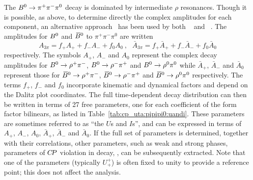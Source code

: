 The $B^0 \to \pi^+\pi^-\pi^0$ decay is dominated by 
intermediate $\rho$ resonances.
Though it is possible, as above, 
to determine directly the complex amplitudes for each component,
an alternative approach~\cite{Snyder:1993mx,Quinn:2000by}
has been used by both \babar~\cite{Aubert:2007jn,Lees:2013nwa}
and \belle~\cite{Kusaka:2007dv,:2007mj}.
The amplitudes for $B^0$ and $\kern 0.18em\overline{\kern -0.18em B}{}^0$ to $\pi^+\pi^-\pi^0$ are written
\begin{equation}
  A_{3\pi} = f_+ A_+ + f_- A_- + f_0 A_0
  \ , \ \ \ 
  \bar{A}_{3\pi} = f_+ \bar{A}_+ + f_- \bar{A}_- + f_0 \bar{A}_0
\end{equation}
respectively.
The symbols $A_+$, $A_-$ and $A_0$
represent the complex decay amplitudes for 
$B^0 \to \rho^+\pi^-$, $B^0 \to \rho^-\pi^+$ and $B^0 \to \rho^0\pi^0$
while 
$\bar{A}_+$, $\bar{A}_-$ and $\bar{A}_0$
represent those for 
$\kern 0.18em\overline{\kern -0.18em B}{}^0 \to \rho^+\pi^-$, $\kern 0.18em\overline{\kern -0.18em B}{}^0 \to \rho^-\pi^+$ and $\kern 0.18em\overline{\kern -0.18em B}{}^0 \to \rho^0\pi^0$
respectively.
The terms $f_+$, $f_-$ and $f_0$ incorporate kinematic and dynamical factors
and depend on the Dalitz plot coordinates.
The full time-dependent decay distribution can then be written 
in terms of 27 free parameters,
one for each coefficient of the form factor bilinears,
as listed in Table~\ref{tab:cp_uta:pipipi0:uandi}.
These parameters are sometimes referred to as ``the $U$s and $I$s'',
and can be expressed in terms of 
$A_+$, $A_-$, $A_0$, $\bar{A}_+$, $\bar{A}_-$ and $\bar{A}_0$.
If the full set of parameters is determined,
together with their correlations,
other parameters, such as weak and strong phases,
parameters of $C\!P$ violation in decay, \etc, 
can be subsequently extracted.
Note that one of the parameters (typically $U_+^+$)
is often fixed to unity to provide a reference point;
this does not affect the analysis.


